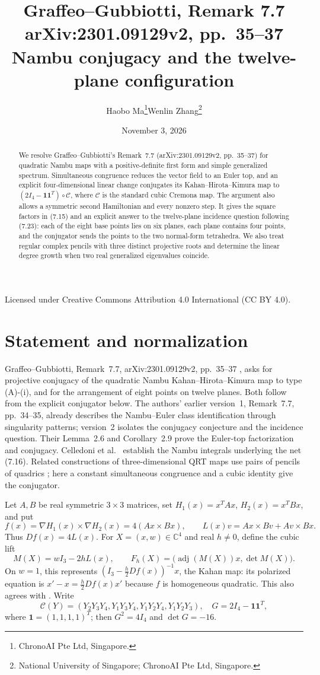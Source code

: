 \documentclass[11pt]{article}
\title{Graffeo--Gubbiotti, Remark 7.7\newline
\large arXiv:2301.09129v2, pp.\ 35--37\newline
\Large Nambu conjugacy and the twelve-plane configuration}
\author{Haobo Ma\thanks{ChronoAI Pte Ltd, Singapore.}\qquad Wenlin Zhang\thanks{National University of Singapore; ChronoAI Pte Ltd, Singapore.}}
\date{November 3, 2026}
\newcommand{\C}{\mathbb C}
\newcommand{\adj}{\operatorname{adj}}
\newcommand{\Cr}{\mathcal C}
\begin{document}
\maketitle
\begin{abstract}
\setlength{\emergencystretch}{2em}
We resolve Graffeo--Gubbiotti's Remark~7.7
(arXiv:2301.09129v2, pp.\ 35--37) for quadratic Nambu maps with a
positive-definite first form and simple generalized spectrum.
Simultaneous congruence reduces the vector field to an Euler top, and an explicit
four-dimensional linear change conjugates its Kahan--Hirota--Kimura map to
$(2I_4-\mathbf1\mathbf1^T)\circ\Cr$, where $\Cr$ is the standard cubic Cremona map.
The argument also allows a symmetric second Hamiltonian and every nonzero step.
It gives the square factors in (7.15) and an explicit answer to the
twelve-plane incidence question following (7.23): each of the eight base
points lies on six planes, each plane contains four points, and the conjugator
sends the points to the two normal-form tetrahedra.
We also treat regular complex pencils with three distinct projective roots
and determine the linear degree growth when two real generalized eigenvalues coincide.
\end{abstract}
\noindent\small Licensed under Creative Commons Attribution 4.0 International
(CC BY 4.0).\normalsize

\section{Statement and normalization}
Graffeo--Gubbiotti, Remark~7.7, arXiv:2301.09129v2, pp.\ 35--37
\cite{GG}, asks for projective conjugacy of the quadratic Nambu
Kahan--Hirota--Kimura map to type (A)-(i), and for the arrangement of eight
points on twelve planes. Both follow from the explicit conjugator below.
The authors' earlier version~1, Remark~7.7, pp.\ 34--35, already describes the
Nambu--Euler class identification through singularity patterns; version~2
isolates the conjugacy conjecture and the incidence question.
Their Lemma~2.6 and Corollary~2.9 prove the Euler-top factorization and conjugacy.
Celledoni et al.\ \cite[Proposition~5]{Celledoni} establish the Nambu
integrals underlying the net (7.16). Related constructions of three-dimensional
QRT maps use pairs of pencils of quadrics \cite[Sections~3--5]{AS}; here a
constant simultaneous congruence and a cubic identity give the conjugator.

Let $A,B$ be real symmetric $3\times3$ matrices, set
$H_1(x)=x^TAx$, $H_2(x)=x^TBx$, and put
\[
 f(x)=\nabla H_1(x)\times\nabla H_2(x)=4(Ax\times Bx),\qquad
 L(x)v=Ax\times Bv+Av\times Bx.
\]
Thus $Df(x)=4L(x)$. For $X=(x,w)\in\C^4$ and real $h\ne0$, define the cubic lift
\begin{equation}\label{eq:lift}
 M(X)=wI_3-2hL(x),\qquad
 F_h(X)=\bigl(\adj(M(X))x,\det M(X)\bigr).
\end{equation}
On $w=1$, this represents $(I_3-\frac h2 Df(x))^{-1}x$, the Kahan map:
its polarized equation is $x'-x=\frac h2 Df(x)x'$ because $f$ is homogeneous
quadratic. This also agrees with \cite[(2.2)--(2.3)]{GG}.
Write
\[
 \Cr(Y)=(Y_2Y_3Y_4,Y_1Y_3Y_4,Y_1Y_2Y_4,Y_1Y_2Y_3),\quad
 G=2I_4-\mathbf1\mathbf1^T,
\]
where $\mathbf1=(1,1,1,1)^T$; then $G^2=4I_4$ and $\det G=-16$.
\end{document}
